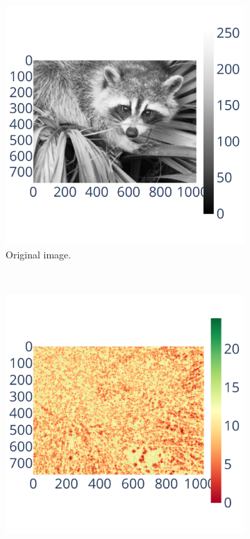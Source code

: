 \documentclass[10pt,journal,compsoc]{IEEEtran}
\begin{document}
\begin{figure}
    \centering
    \begin{subfigure}{.3\linewidth}
        \includegraphics[width=\linewidth]{figure/bspline/original_image.pdf}
        \caption{Original image.}
        \label{fig:bspline_original_image}
    \end{subfigure}\\
    \begin{subfigure}{0.3\linewidth}
        \includegraphics[width=\linewidth]{figure/bspline/bspline_sig.pdf}

\end{subfigure}
\end{figure}
\end{document}
